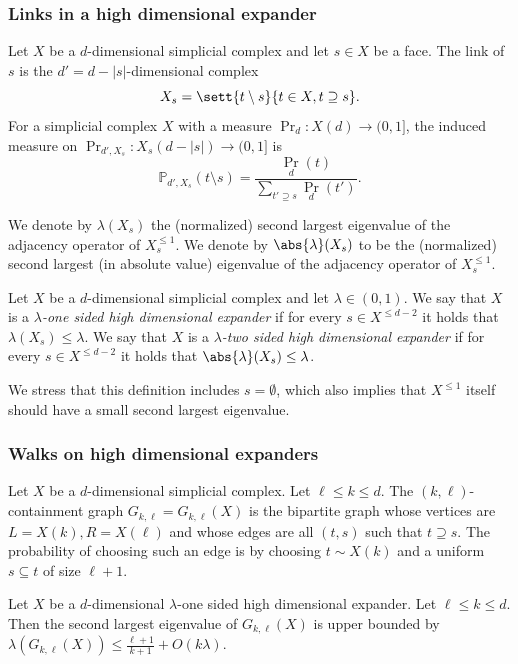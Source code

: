 \subsubsection*{Links in a high dimensional expander} Let \(X\) be a \(d\)-dimensional simplicial complex and let \(s \in X\) be a face. The link of \(s\) is the \(d'=d-|s|\)-dimensional complex
\[X_s = \sett{t \setminus s}{t \in X, t \supseteq s}.\]
For a simplicial complex \(X\) with a measure \(\Pr_d:X(d) \to (0,1]\), the induced measure on \(\Pr_{d',X_s}:X_s(d-|s|)\to (0,1]\) is
\[\mathbb{P}_{d',X_s}(t \setminus s) = \frac{\Pr_d(t)}{\sum_{t' \supseteq s} \Pr_d(t')}.\]

We denote by \(\lambda(X_s)\) the (normalized) second largest eigenvalue of the adjacency operator of \(X_s^{\leq 1}\). We denote by \(\abs{\lambda}(X_s)\) to be the (normalized) second largest (in absolute value) eigenvalue of the adjacency operator of \(X_s^{\leq 1}\).

\begin{definition}
    Let \(X\) be a \(d\)-dimensional simplicial complex and let \(\lambda \in (0,1)\). We say that \(X\) is a \emph{\(\lambda\)-one sided high dimensional expander} if for every \(s \in X^{\leq d-2}\) it holds that \(\lambda(X_s) \leq \lambda\). We say that \(X\) is a \emph{\(\lambda\)-two sided high dimensional expander} if for every \(s \in X^{\leq d-2}\) it holds that \(\abs{\lambda}(X_s) \leq \lambda\).
\end{definition}
We stress that this definition includes \(s= \emptyset\), which also implies that \(X^{\leq 1}\) itself should have a small second largest eigenvalue.

\subsubsection*{Walks on high dimensional expanders}
Let \(X\) be a \(d\)-dimensional simplicial complex. Let \(\ell \leq k \leq d\). The \((k,\ell)\)-containment graph \(G_{k,\ell}=G_{k,\ell}(X)\) is the bipartite graph whose vertices are \(L=X(k), R=X(\ell)\) and whose edges are all \((t,s)\) such that \(t \supseteq s\). The probability of choosing such an edge is by choosing \(t \sim X(k)\) and a uniform \(s \subseteq t\) of size \(\ell+1\).

\begin{theorem} \label{thm:eignevalues-of-walk}
    Let \(X\) be a \(d\)-dimensional \(\lambda\)-one sided high dimensional expander. Let \(\ell \leq k \leq d\). Then the second largest eigenvalue of \(G_{k,\ell}(X)\) is upper bounded by \(\lambda(G_{k,\ell}(X)) \leq \frac{\ell+1}{k+1} + O(k\lambda)\).
\end{theorem}

